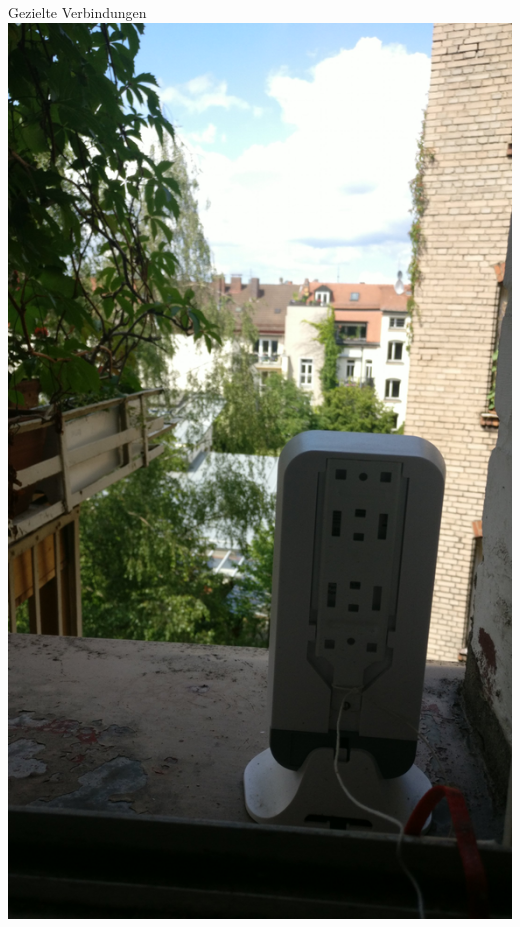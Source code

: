 \documentclass{beamer}
\begin{document}
	\begin{frame}[standout]{Gezielte Verbindungen}
		\includegraphics[height=0.75\framewidth]{media/p2p-fensterbrett1.jpg}
	\end{frame}
\end{document}
